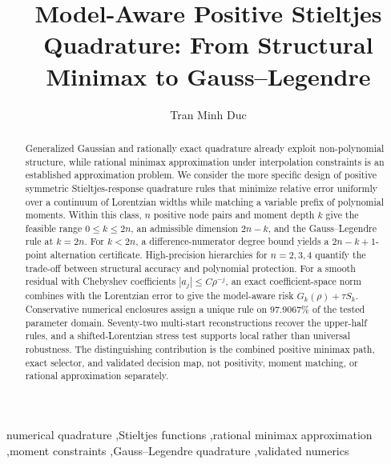 \documentclass[preprint,12pt]{elsarticle}
\theoremstyle{remark}
\begin{document}
\begin{frontmatter}

\title{Model-Aware Positive Stieltjes Quadrature:
From Structural Minimax to Gauss--Legendre}

\author[inst1]{Tran Minh Duc}


\begin{abstract}
Generalized Gaussian and rationally exact quadrature already exploit
non-polynomial structure, while rational minimax approximation under
interpolation constraints is an established approximation problem. We
consider the more specific design of positive symmetric
Stieltjes-response quadrature rules that minimize relative error
uniformly over a continuum of Lorentzian widths while matching a
variable prefix of polynomial moments. Within this class, \(n\) positive
node pairs and moment depth \(k\) give the feasible range
\(0\leq k\leq2n\), an admissible dimension \(2n-k\), and the
Gauss--Legendre rule at \(k=2n\). For \(k<2n\), a difference-numerator
degree bound yields a \(2n-k+1\)-point alternation certificate.
High-precision hierarchies for \(n=2,3,4\) quantify the trade-off
between structural accuracy and polynomial protection. For a smooth
residual with Chebyshev coefficients \(|a_j|\leq C\rho^{-j}\), an exact
coefficient-space norm combines with the Lorentzian error to give the
model-aware risk \(G_k(\rho)+\tau S_k\). Conservative numerical
enclosures assign a unique rule on 97.9067\% of the tested parameter
domain. Seventy-two multi-start reconstructions recover the upper-half
rules, and a shifted-Lorentzian stress test supports local rather than
universal robustness. The distinguishing contribution is the combined
positive minimax path, exact selector, and validated decision map, not
positivity, moment matching, or rational approximation separately.
\end{abstract}

\begin{keyword}
numerical quadrature \sep Stieltjes functions \sep rational minimax
approximation \sep moment constraints \sep Gauss--Legendre quadrature
\sep validated numerics
\end{keyword}

\end{frontmatter}
\end{document}
